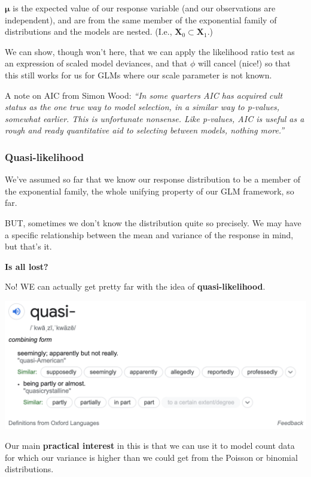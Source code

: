 \documentclass[
  openany]{book}
\begin{document}
\(\mathbf{\mu}\) is the expected value of our response variable (and our
observations are independent), and are from the same member of the
exponential family of distributions and the models are nested. (I.e.,
\(\mathbf{X}_0 \subset \mathbf{X}_1\).)

We can show, though won't here, that we can apply the likelihood ratio
test as an expression of scaled model deviances, and that \(\phi\) will
cancel (nice!) so that this still works for us for GLMs where our scale
parameter is not known.

A note on AIC from Simon Wood: \emph{``In some quarters AIC has acquired cult
status as the one true way to model selection, in a similar way to
p-values, somewhat earlier. This is unfortunate nonsense. Like p-values,
AIC is useful as a rough and ready quantitative aid to selecting between
models, nothing more.''}

\hypertarget{quasi-likelihood}{%
\subsubsection{Quasi-likelihood}\label{quasi-likelihood}}

We've assumed so far that we know our response distribution to be a
member of the exponential family, the whole unifying property of our GLM
framework, so far.

BUT, sometimes we don't know the distribution quite so precisely. We may
have a specific relationship between the mean and variance of the
response in mind, but that's it.

\textbf{Is all lost?}

No! WE can actually get pretty far with the idea of
\textbf{quasi-likelihood}.

\begin{center}\includegraphics[width=0.9\linewidth]{images/m4/quasi} \end{center}

Our main \textbf{practical interest} in this is that we can use it to model
count data for which our variance is higher than we could get from the
Poisson or binomial distributions.
\end{document}
